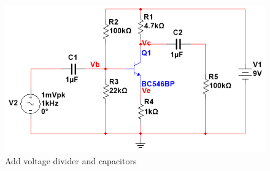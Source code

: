\begin{figure}[htbp]
	\centering
	\includegraphics[scale=0.6]{"../Photo/Chap1/add voltage divider"} 
	\caption{Add voltage divider and capacitors }
	\label{fig:add voltage divider}
\end{figure}



